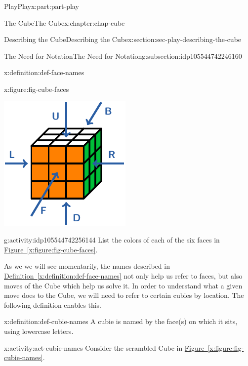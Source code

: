 \documentclass[oneside,10pt,]{book}
\newcommand{\xreffont}{\relax}
\numberwithin{equation}{section}
\begin{document}
\begin{partptx}{Play}{}{Play}{}{}{x:part:part-play}
\begin{chapterptx}{The Cube}{}{The Cube}{}{}{x:chapter:chap-cube}
\begin{sectionptx}{Describing the Cube}{}{Describing the Cube}{}{}{x:section:sec-play-describing-the-cube}
\begin{subsectionptx}{The Need for Notation}{}{The Need for Notation}{}{}{g:subsection:idp105544742246160}
\begin{definition}{}{x:definition:def-face-names}
\begin{figureptx}{}{x:figure:fig-cube-faces}{}
\begin{image}{0.25}{0.5}{0.25}%
\includegraphics[width=\linewidth]{./images/faces.pdf}
\end{image}%
\tcblower
\end{figureptx}%
\end{definition}
\begin{activity}{}{g:activity:idp105544742256144}%
List the colors of each of the six faces in \hyperref[x:figure:fig-cube-faces]{Figure~{\xreffont\ref{x:figure:fig-cube-faces}}}.%
\end{activity}%
As we we will see momentarily, the names described in \hyperref[x:definition:def-face-names]{Definition~{\xreffont\ref{x:definition:def-face-names}}} not only help us refer to faces, but also moves of the Cube which help us solve it. In order to understand what a given move does to the Cube, we will need to refer to certain cubies by location. The following definition enables this.%
\begin{definition}{}{x:definition:def-cubie-names}%
A cubie is named by the face(s) on which it sits, using lowercase letters.%
\end{definition}
\begin{activity}{}{x:activity:act-cubie-names}%
Consider the scrambled Cube in \hyperref[x:figure:fig-cubie-names]{Figure~{\xreffont\ref{x:figure:fig-cubie-names}}}.%

\end{activity}
\end{subsectionptx}
\end{sectionptx}
\end{chapterptx}
\end{partptx}
\end{document}
